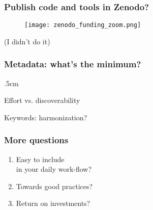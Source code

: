 \begin{frame}
\frametitle{Publish code and tools in Zenodo?}

\begin{figure}
\texttt{[image: zenodo\_funding\_zoom.png]}
\end{figure}

(I didn't do it)
\end{frame}


\begin{frame}[c]
\frametitle{Metadata: what's the minimum?}

\parskip .5cm

Effort vs. discoverability

Keywords: harmonization? 




\end{frame}


\begin{frame}

\frametitle{More questions}

\begin{enumerate}

\item Easy to include\\
in your daily work-flow?

\item Towards good practices?

\item Return on investments?  



\end{enumerate}

\end{frame}




